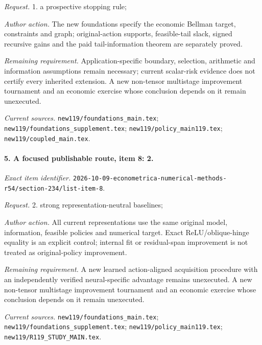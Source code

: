 \par\emph{Request.} 1. a prospective stopping rule;

\par\emph{Author action.} The new foundations specify the economic Bellman target, constraints and graph; original-action supports, feasible-tail slack, signed recursive gains and the paid tail-information theorem are separately proved.

\par\emph{Remaining requirement.} Application-specific boundary, selection, arithmetic and information assumptions remain necessary; current scalar-risk evidence does not certify every inherited extension. A new non-tensor multistage improvement tournament and an economic exercise whose conclusion depends on it remain unexecuted.

\par\emph{Current sources.} \nolinkurl{new119/foundations_main.tex}; \nolinkurl{new119/foundations_supplement.tex}; \nolinkurl{new119/policy_main119.tex}; \nolinkurl{new119/coupled_main.tex}.

\paragraph{5. A focused publishable route, item 8: 2.}

\emph{Exact item identifier.} \nolinkurl{2026-10-09-econometrica-numerical-methods-r54/section-234/list-item-8}.

\par\emph{Request.} 2. strong representation-neutral baselines;

\par\emph{Author action.} All current representations use the same original model, information, feasible policies and numerical target. Exact ReLU/\allowbreak{}oblique-hinge equality is an explicit control; internal fit or residual-span improvement is not treated as original-policy improvement.

\par\emph{Remaining requirement.} A new learned action-aligned acquisition procedure with an independently verified neural-specific advantage remains unexecuted. A new non-tensor multistage improvement tournament and an economic exercise whose conclusion depends on it remain unexecuted.

\par\emph{Current sources.} \nolinkurl{new119/foundations_main.tex}; \nolinkurl{new119/foundations_supplement.tex}; \nolinkurl{new119/policy_main119.tex}; \nolinkurl{new119/R119_STUDY_MAIN.tex}.

